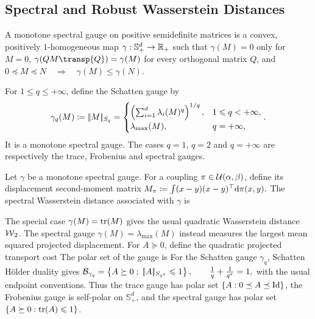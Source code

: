 \subsection{Spectral and Robust Wasserstein Distances}
\label{sec-spectral-subspace-wasserstein}
\begin{defn}\label{def-monotone-spectral-gauge}
A monotone spectral gauge on positive semidefinite matrices is a convex, positively $1$-homogeneous map $\gamma:\mathbb S_+^d\to\mathbb{R}_+$ such that $\gamma(M)=0$ only for $M=0$, $\gamma(QM\transp{Q})=\gamma(M)$ for every orthogonal matrix $Q$, and
\(0\preceq M\preceq N \quad\Longrightarrow\quad \gamma(M)\leq\gamma(N).\)
\end{defn}
\begin{defn}\label{def-schatten-gauge}
For $1\leq q\leq+\infty$, define the Schatten gauge by
\[
\gamma_q(M)\coloneqq|\!| M |\!|_{S_q}
=
\begin{cases}
\left( \sum_{i=1}^d\lambda_i(M)^q \right)^{1/q}, & 1\leqslant q<+\infty,\\
\lambda_{\max}(M), & q=+\infty,
\end{cases}.
\]
It is a monotone spectral gauge. The cases $q=1$, $q=2$ and $q=+\infty$ are respectively the trace, Frobenius and spectral gauges.
\end{defn}
\begin{defn}\label{def-spectral-wasserstein}
Let $\gamma$ be a monotone spectral gauge. For a coupling $\pi\in\mathcal{U}(\alpha,\beta)$, define its displacement second-moment matrix
\(M_\pi\coloneqq\int (x-y)(x-y)^\top\mathrm{d}\pi(x,y).\)
The spectral Wasserstein distance associated with $\gamma$ is
\end{defn}
The special case $\gamma(M)=\operatorname{tr}(M)$ gives the usual quadratic Wasserstein distance $\operatorname{\mathcal{W}}_2$. The spectral gauge $\gamma(M)=\lambda_{\max}(M)$ instead measures the largest mean squared projected displacement. For $A\succeq0$, define the quadratic projected transport cost
The polar set of the gauge is
For the Schatten gauge $\gamma_q$, Schatten H\"older duality gives \(\mathcal B_{\gamma_q} = \left\{ A\succeq0 \;;\; |\!| A |\!|_{S_{q^\ast}}\leqslant1 \right\}, \qquad \frac1q+\frac1{q^\ast}=1,\)
with the usual endpoint conventions. Thus the trace gauge has polar set $\{A:0\preceq A\preceq\mathrm{Id}\}$, the Frobenius gauge is self-polar on $\mathbb S_+^d$, and the spectral gauge has polar set $\{A\succeq0:\operatorname{tr}(A)\leqslant1\}$.

